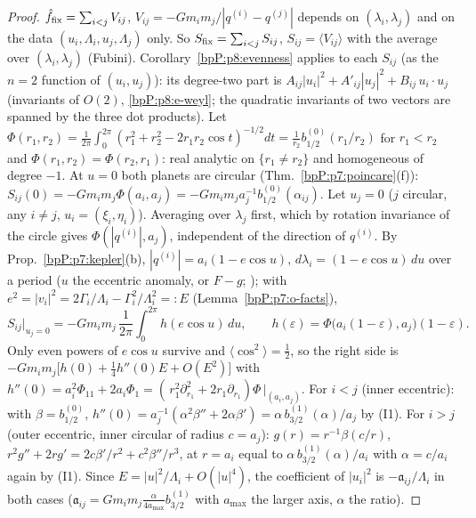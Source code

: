 \begin{proof}
\label{stepP:p8:qf-pair} $\hat f_{\rm fix}=\sum_{i<j}V_{ij}$, $V_{ij}=-Gm_im_j/|q^{(i)}-q^{(j)}|$ depends on $(\lambda_i,\lambda_j)$ and on the data $(u_i,\Lambda_i,u_j,\Lambda_j)$ only. So $S_{\rm fix}=\sum_{i<j}S_{ij}$, $S_{ij}=\langle V_{ij}\rangle$ with the average over $(\lambda_i,\lambda_j)$ (Fubini). Corollary~\ref{bpP:p8:evenness} applies to each $S_{ij}$ (as the $n=2$ function of $(u_i,u_j)$): its degree-two part is $A_{ij}|u_i|^2+A'_{ij}|u_j|^2+B_{ij}\,u_i\cdot u_j$ (invariants of $O(2)$, \ref{bpP:p8:e-weyl}; the quadratic invariants of two vectors are spanned by the three dot products).
\label{stepP:p8:qf-scale} Let $\Phi(r_1,r_2)=\frac1{2\pi}\int_0^{2\pi}(r_1^2+r_2^2-2r_1r_2\cos t)^{-1/2}dt=\frac1{r_2}b_{1/2}^{(0)}(r_1/r_2)$ for $r_1<r_2$ and $\Phi(r_1,r_2)=\Phi(r_2,r_1)$: real analytic on $\{r_1\ne r_2\}$ and homogeneous of degree $-1$.
\label{stepP:p8:qf-c0} At $u=0$ both planets are circular (Thm.~\ref{bpP:p7:poincare}(f)): $S_{ij}(0)=-Gm_im_j\Phi(a_i,a_j)=-Gm_im_ja_j^{-1}b_{1/2}^{(0)}(\alpha_{ij})$.
\label{stepP:p8:qf-diag} Let $u_j=0$ ($j$ circular, any $i\ne j$, $u_i=(\xi_i,\eta_i)$). Averaging over $\lambda_j$ first, which by rotation invariance of the circle gives $\Phi(|q^{(i)}|,a_j)$, independent of the direction of $q^{(i)}$. By Prop.~\ref{bpP:p7:kepler}(b), $|q^{(i)}|=a_i(1-e\cos u)$, $d\lambda_i=(1-e\cos u)\,du$ over a period ($u$ the eccentric anomaly, or $F-g$; ); with $e^2=|v_i|^2=2\Gamma_i/\Lambda_i-\Gamma_i^2/\Lambda_i^2=:E$ (Lemma~\ref{bpP:p7:o-facts}),
\[S_{ij}\big|_{u_j=0}=-Gm_im_j\,\frac1{2\pi}\int_0^{2\pi}h(e\cos u)\,du,\qquad h(\varepsilon)=\Phi\big(a_i(1-\varepsilon),a_j\big)(1-\varepsilon).\]
Only even powers of $e\cos u$ survive and $\langle\cos^2\rangle=\tfrac12$, so the right side is $-Gm_im_j\big[h(0)+\tfrac14h''(0)E+O(E^2)\big]$ with $h''(0)=a_i^2\Phi_{11}+2a_i\Phi_1=(\,r_1^2\partial_{r_1}^2+2r_1\partial_{r_1})\Phi\,|_{(a_i,a_j)}$. For $i<j$ (inner eccentric): with $\beta=b_{1/2}^{(0)}$, $h''(0)=a_j^{-1}(\alpha^2\beta''+2\alpha\beta')=\alpha\,b^{(1)}_{3/2}(\alpha)/a_j$ by (I1). For $i>j$ (outer eccentric, inner circular of radius $c=a_j$): $g(r)=r^{-1}\beta(c/r)$, $r^2g''+2rg'=2c\beta'/r^2+c^2\beta''/r^3$, at $r=a_i$ equal to $\alpha\,b^{(1)}_{3/2}(\alpha)/a_i$ with $\alpha=c/a_i$ again by (I1). Since $E=|u|^2/\Lambda_i+O(|u|^4)$, the coefficient of $|u_i|^2$ is $-\mathfrak a_{ij}/\Lambda_i$ in both cases ($\mathfrak a_{ij}=Gm_im_j\frac\alpha{4a_{\max}}b^{(1)}_{3/2}$ with $a_{\max}$ the larger axis, $\alpha$ the ratio).

\end{proof}

